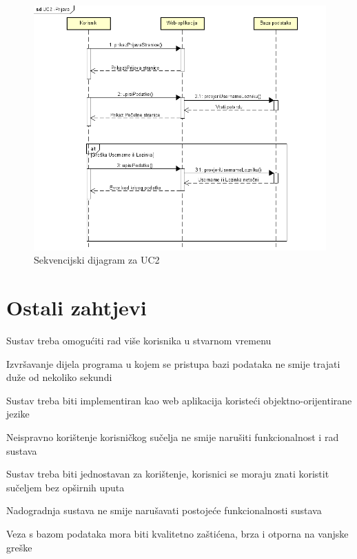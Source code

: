 				\begin{figure}[h]
					\includegraphics[width=\textwidth]{slike/Prijava.png}
					\caption{Sekvencijski dijagram za UC2}
				\end{figure}
				
				\eject
	
		\section{Ostali zahtjevi}
		 
			 \begin{packed_item}
			 \item  Sustav treba omogućiti rad više korisnika u stvarnom vremenu
			 \item Izvršavanje dijela programa u kojem se pristupa bazi podataka ne smije trajati duže od nekoliko sekundi
			 \item Sustav treba biti implementiran kao web aplikacija koristeći objektno-orijentirane jezike
			 \item Neispravno korištenje korisničkog sučelja ne smije narušiti funkcionalnost i rad sustava
			 \item Sustav treba biti jednostavan za korištenje, korisnici se moraju znati koristit sučeljem bez opširnih uputa
			 \item Nadogradnja sustava ne smije narušavati postojeće funkcionalnosti sustava
			 \item Veza s bazom podataka mora biti kvalitetno zaštićena, brza i otporna na vanjske greške
			 \end{packed_item}
	